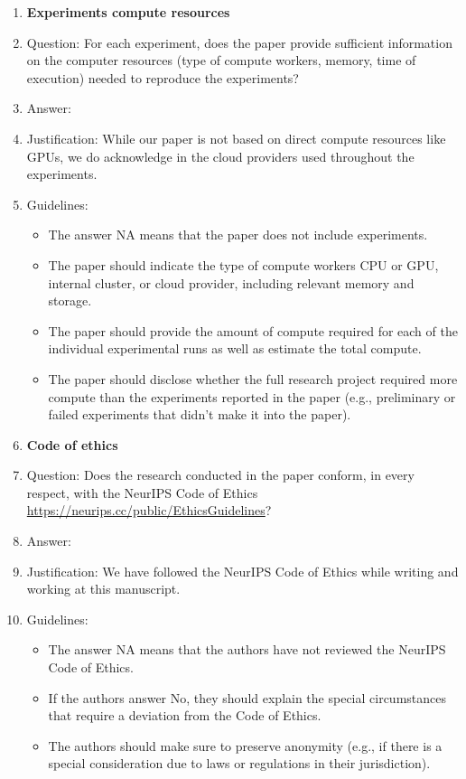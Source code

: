 \documentclass{article}
\begin{document}
\begin{enumerate}
\item {\bf Experiments compute resources}
    \item[] Question: For each experiment, does the paper provide sufficient information on the computer resources (type of compute workers, memory, time of execution) needed to reproduce the experiments?
    \item[] Answer: \answerYes{} %
    \item[] Justification: While our paper is not based on direct compute resources like GPUs, we do acknowledge in  the cloud providers used throughout the experiments.
    \item[] Guidelines:
    \begin{itemize}
        \item The answer NA means that the paper does not include experiments.
        \item The paper should indicate the type of compute workers CPU or GPU, internal cluster, or cloud provider, including relevant memory and storage.
        \item The paper should provide the amount of compute required for each of the individual experimental runs as well as estimate the total compute. 
        \item The paper should disclose whether the full research project required more compute than the experiments reported in the paper (e.g., preliminary or failed experiments that didn't make it into the paper). 
    \end{itemize}
    
\item {\bf Code of ethics}
    \item[] Question: Does the research conducted in the paper conform, in every respect, with the NeurIPS Code of Ethics \url{https://neurips.cc/public/EthicsGuidelines}?
    \item[] Answer: \answerYes{} %
    \item[] Justification: We have followed the NeurIPS Code of Ethics while writing and working at this manuscript.
    \item[] Guidelines:
    \begin{itemize}
        \item The answer NA means that the authors have not reviewed the NeurIPS Code of Ethics.
        \item If the authors answer No, they should explain the special circumstances that require a deviation from the Code of Ethics.
        \item The authors should make sure to preserve anonymity (e.g., if there is a special consideration due to laws or regulations in their jurisdiction).
    \end{itemize}



\end{enumerate}
\end{document}
